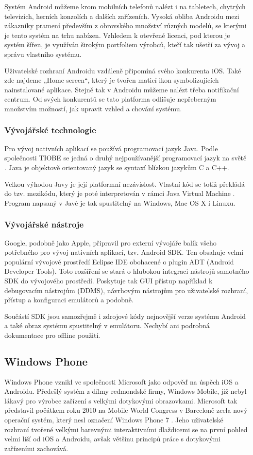 Systém Android můžeme krom mobilních telefonů nalézt i na tabletech, chytrých televizích, herních konzolích a dalších zařízeních. Vysoká obliba Androidu mezi zákazníky pramení především z obrovského množství různých modelů, se kterými je tento systém na trhu nabízen. Vzhledem k otevřené licenci, pod kterou je systém šířen, je využíván širokým portfoliem výrobců, kteří tak ušetří za vývoj a správu vlastního systému.

Uživatelské rozhraní Androidu vzdáleně připomíná svého konkurenta iOS. Také zde najdeme „Home screen“, který je tvořen maticí ikon symbolizujících nainstalované aplikace. Stejně tak v Androidu můžeme nalézt třeba notifikační centrum. Od svých konkurentů se tato platforma odlišuje nepřeberným množstvím možností, jak upravit vzhled a chování systému.

\subsubsection{Vývojářské technologie}
Pro vývoj nativních aplikací se používá programovací jazyk Java. Podle společnosti TIOBE se jedná o druhý nejpoužívanější programovací jazyk na světě \cite{tiobe_software}. Java je objektově orientovaný jazyk se syntaxí blízkou jazykům C a C++.

Velkou výhodou Javy je její platformní nezávislost. Vlastní kód se totiž překládá do tzv. mezikódu, který je poté interpretován v rámci Java Virtual Machine \cite{understanding_jvm_internals}. Program napsaný v Javě je tak spustitelný na Windows, Mac OS X i Linuxu.

\subsubsection{Vývojářské nástroje}
Google, podobně jako Apple, připravil pro externí vývojáře balík všeho potřebného pro vývoj nativních aplikací, tzv. Android SDK. Ten obsahuje velmi populární vývojové prostředí Eclipse IDE obohacené o plugin ADT (Android Developer Tools). Toto rozšíření se stará o hlubokou integraci nástrojů samotného SDK do vývojového prostředí. Poskytuje tak GUI přístup například k debugovacím nástrojům (DDMS), návrhovým nástrojům pro uživatelské rozhraní, přístup a konfiguraci emulátorů a podobně.

Součástí SDK jsou samozřejmě i zdrojové kódy nejnovější verze systému Android a také obraz systému spustitelný v emulátoru. Nechybí ani podrobná dokumentace pro offline použití.

\subsection{Windows Phone}
Windows Phone vznikl ve společnosti Microsoft jako odpověď na úspěch iOS a Androidu. Předešlý systém z dílmy redmondské firmy, Windows Mobile, již nebyl lákavý pro výrobce zařízení s velkými dotykovými obrazovkami. Microsoft tak představil počátkem roku 2010 na Mobile World Congress v Barceloně zcela nový operační systém, který nesl označení Windows Phone 7 \cite{ms_announce_wp}. Jeho uživatelské rozhraní tvořené velkými barevnými interaktivními dlaždicemi se na první pohled velmi liší od iOS a Androidu, avšak většinu principů práce s dotykovými zařízeními zachovává. 

